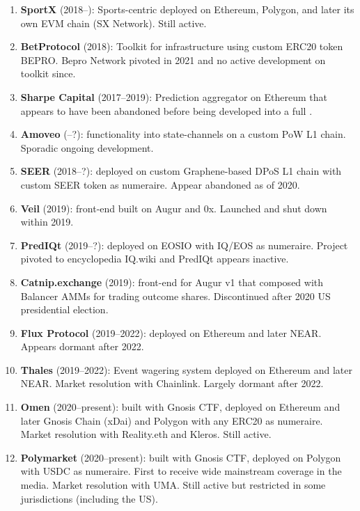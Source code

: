 \begin{enumerate}
\item \textbf{SportX} (2018--): Sports-centric \depm deployed on Ethereum, Polygon, and later its own EVM chain (SX Network). Still active.

\item \textbf{BetProtocol} (2018): Toolkit for \depm infrastructure using custom ERC20 token BEPRO. Bepro Network pivoted in 2021 and no active development on toolkit since.

\item \textbf{Sharpe Capital} (2017--2019): Prediction aggregator on Ethereum that appears to have been abandoned before being developed into a full \depm.

\item \textbf{Amoveo} (--?): \depm functionality into state-channels on a custom PoW L1 chain. Sporadic ongoing development.

\item \textbf{SEER} (2018--?): \depm deployed on custom Graphene-based DPoS L1 chain with custom SEER token as numeraire. Appear abandoned as of 2020.

\item \textbf{Veil} (2019): \depm front-end built on Augur and 0x. Launched and shut down within 2019.

\item \textbf{PredIQt} (2019--?): \depm deployed on EOSIO with IQ/EOS as numeraire. Project pivoted to encyclopedia IQ.wiki and PredIQt appears inactive.

\item \textbf{Catnip.exchange} (2019): \depm front-end for Augur v1 that composed with Balancer AMMs for trading outcome shares. Discontinued after 2020 US presidential election.

\item \textbf{Flux Protocol} (2019--2022): \depm deployed on Ethereum and later NEAR. Appears dormant after 2022. 

\item \textbf{Thales} (2019--2022): Event wagering system deployed on Ethereum and later NEAR. Market resolution with Chainlink. Largely dormant after 2022.

\item \textbf{Omen} (2020--present): \depm built with Gnosis CTF, deployed on Ethereum and later Gnosis Chain (xDai) and Polygon with any ERC20 as numeraire. Market resolution with Reality.eth and Kleros. Still active.

\item \textbf{Polymarket} (2020--present): \depm built with Gnosis CTF, deployed on Polygon with USDC as numeraire. First \depm to receive wide mainstream coverage in the media. Market resolution with UMA. Still active but restricted in some jurisdictions (including the US). 


\end{enumerate}
